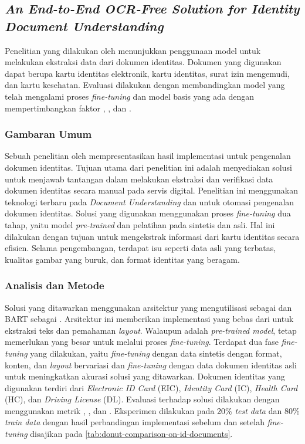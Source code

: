 \subsection{\textit{An End-to-End OCR-Free Solution for Identity Document \linebreak Understanding}}
\label{sec:penelitian-2}
Penelitian yang dilakukan oleh   menunjukkan penggunaan model \donut{} untuk melakukan ekstraksi data dari dokumen identitas. Dokumen yang digunakan dapat berupa kartu identitas elektronik, kartu identitas, surat izin 
mengemudi, dan kartu kesehatan. Evaluasi dilakukan dengan membandingkan model yang telah mengalami proses \textit{fine-tuning} dan model basis yang ada dengan mempertimbangkan faktor \fscore, \mcerfull, dan \tedfull. 

\subsubsection{Gambaran Umum}
Sebuah penelitian oleh  mempresentasikan hasil implementasi \donut{} untuk pengenalan dokumen identitas. Tujuan utama dari penelitian ini adalah menyediakan solusi untuk menjawab tantangan dalam melakukan ekstraksi dan verifikasi data dokumen identitas secara manual pada servis digital. Penelitian ini menggunakan teknologi terbaru pada \textit{Document Understanding} dan \ml{} untuk otomasi pengenalan dokumen identitas. Solusi yang digunakan menggunakan proses \textit{fine-tuning} dua tahap, yaitu model \textit{pre-trained} dan pelatihan pada \dataset{} sintetis dan asli. Hal ini dilakukan dengan tujuan untuk mengekstrak informasi dari kartu identitas secara efisien. Selama pengembangan, terdapat isu seperti data asli yang terbatas, kualitas gambar yang buruk, dan format identitas yang beragam. 

\subsubsection{Analisis dan Metode}
Solusi yang ditawarkan menggunakan arsitektur \transformer{} \donut{} yang mengutilisasi \swin{} sebagai \encoder{} dan BART sebagai \decoder{}. Arsitektur ini memberikan implementasi yang bebas dari \ocr{} untuk ekstraksi teks dan pemahaman \emph{layout}. Walaupun \donut{} adalah \textit{pre-trained model}, \donut{} tetap memerlukan \dataset{} yang besar untuk melalui proses \emph{fine-tuning}. Terdapat dua fase \emph{fine-tuning} yang dilakukan, yaitu \emph{fine-tuning} dengan data sintetis dengan format, konten, dan \emph{layout} bervariasi dan \emph{fine-tuning} dengan data dokumen identitas asli untuk meningkatkan akurasi solusi yang ditawarkan. Dokumen identitas yang digunakan terdiri dari \emph{Electronic ID Card} (EIC), \emph{Identity Card} (IC), \emph{Health Card} (HC), dan \emph{Driving License} (DL). Evaluasi terhadap solusi dilakukan dengan menggunakan metrik \fscore, \mcerfull, dan \tedfull. Eksperimen dilakukan pada 20\% \emph{test data} dan 80\% \emph{train data} dengan hasil perbandingan implementasi \donut{} sebelum dan setelah \textit{fine-tuning} disajikan pada \autoref{tab:donut-comparison-on-id-documents}. 


